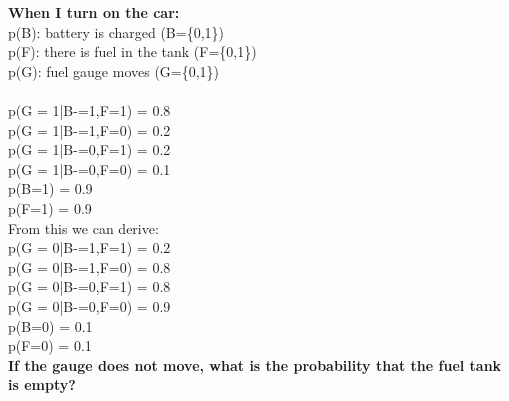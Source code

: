\documentclass{article}
\begin{document}
\textbf{When I turn on the car:} \\
p(B): battery is charged (B=\{0,1\})\\
p(F): there is fuel in the tank (F=\{0,1\})\\
p(G): fuel gauge moves (G=\{0,1\})\\
\\
p(G = 1|B-=1,F=1) = 0.8 \\
p(G = 1|B-=1,F=0) = 0.2 \\
p(G = 1|B-=0,F=1) = 0.2 \\
p(G = 1|B-=0,F=0) = 0.1 \\
p(B=1) = 0.9 \\
p(F=1) = 0.9 \\
From this we can derive: \\
p(G = 0|B-=1,F=1) = 0.2 \\
p(G = 0|B-=1,F=0) = 0.8 \\
p(G = 0|B-=0,F=1) = 0.8 \\
p(G = 0|B-=0,F=0) = 0.9 \\
p(B=0) = 0.1 \\
p(F=0) = 0.1 \\
\textbf{If the gauge does not move, what is the probability that the fuel tank is empty?} \\
\end{document}
